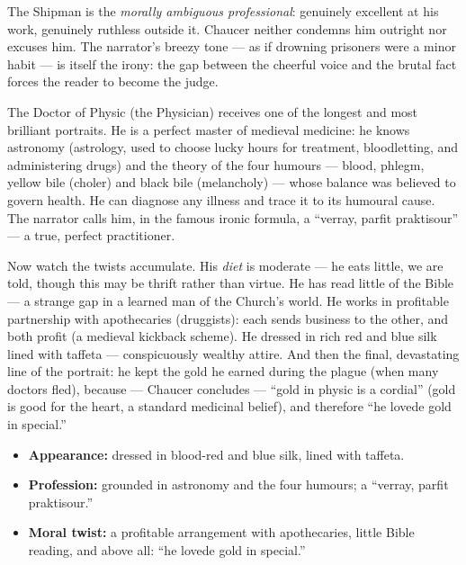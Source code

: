 \documentclass[11pt]{article}
\newcommand{\cle}[1]{{\popxbold\color{popdark}#1}}
\newcounter{popsec}
\newcounter{popsub}
\newcommand{\courssub}[1]{%
  \stepcounter{popsub}%
  \par\vspace{9pt}\noindent{\popxbold\fontsize{11.5}{13}\selectfont\color{popink}{\color{poporange}\thepopsec.\thepopsub}\hspace{6pt}#1}\par\nopagebreak\vspace{4pt}
}
\begin{document}
The Shipman is the \emph{morally ambiguous professional}: genuinely excellent at his work, genuinely ruthless outside it. Chaucer neither condemns him outright nor excuses him. The narrator's breezy tone — as if drowning prisoners were a minor habit — is itself the irony: the gap between the cheerful voice and the brutal fact forces the reader to become the judge.

\courssub{The Doctor: Medicine and the Love of Gold}

The Doctor of Physic (the Physician) receives one of the longest and most brilliant portraits. He is a perfect master of medieval medicine: he knows \cle{astronomy} (astrology, used to choose lucky hours for treatment, bloodletting, and administering drugs) and the theory of the four \cle{humours} — blood, phlegm, yellow bile (choler) and black bile (melancholy) — whose balance was believed to govern health. He can diagnose any illness and trace it to its humoural cause. The narrator calls him, in the famous ironic formula, a ``verray, parfit praktisour'' — a true, perfect practitioner.

Now watch the twists accumulate. His \emph{diet} is moderate — he eats little, we are told, though this may be thrift rather than virtue. He has read little of the Bible — a strange gap in a learned man of the Church's world. He works in profitable partnership with \cle{apothecaries} (druggists): each sends business to the other, and both profit (a medieval kickback scheme). He dressed in rich red and blue silk lined with taffeta — conspicuously wealthy attire. And then the final, devastating line of the portrait: he kept the gold he earned during the plague (when many doctors fled), because — Chaucer concludes — ``\cle{gold in physic is a cordial}'' (gold is good for the heart, a standard medicinal belief), and therefore ``he lovede gold in special.''

\begin{exemplebox}
\begin{itemize}
\item \textbf{Appearance:} dressed in blood-red and blue silk, lined with taffeta.
\item \textbf{Profession:} grounded in astronomy and the four humours; a ``verray, parfit praktisour.''
\item \textbf{Moral twist:} a profitable arrangement with apothecaries, little Bible reading, and above all: ``he lovede gold in special.''
\end{itemize}
\end{exemplebox}
\end{document}

